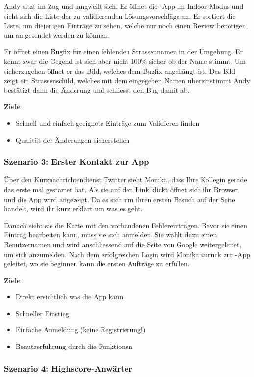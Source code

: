 Andy sitzt im Zug und langweilt sich.
Er öffnet die \kort{}-App im Indoor-Modus und sieht sich die Liste der zu validierenden Lösungsvorschläge an. 
Er sortiert die Liste, um diejenigen Einträge zu sehen, welche nur noch einen Review benötigen, um an  gesendet werden zu können.

Er öffnet einen Bugfix für einen fehlenden Strassennamen in der Umgebung.
Er kennt zwar die Gegend ist sich aber nicht 100\% sicher ob der Name stimmt.
Um sicherzugehen öffnet er das Bild, welches dem Bugfix angehängt ist.
Das Bild zeigt ein Strassenschild, welches mit dem eingegeben Namen übereinstimmt
Andy bestätigt dann die Änderung und schliesst den Bug damit ab.

\textbf{Ziele}
\begin{itemize}
\item Schnell und einfach geeignete Einträge zum Validieren finden
\item Qualität der Änderungen sicherstellen
\end{itemize}

\subsubsection{Szenario 3: Erster Kontakt zur App}

Über den Kurznachrichtendienst Twitter sieht Monika, dass Ihre Kollegin gerade das erste mal \kort{} gestartet hat.
Als sie auf den Link klickt öffnet sich ihr Browser und die App wird angezeigt.
Da es sich um ihren ersten Besuch auf der Seite handelt, wird ihr kurz erklärt um was es geht.

Danach sieht sie die Karte mit den vorhandenen Fehlereinträgen.
Bevor sie einen Eintrag bearbeiten kann, muss sie sich anmelden.
Sie wählt dazu einen Benutzernamen und wird anschliessend auf die Seite von Google weitergeleitet, um sich anzumelden.
Nach dem erfolgreichen Login wird Monika zurück zur \kort{}-App geleitet, wo sie beginnen kann die ersten Aufträge zu erfüllen.

\textbf{Ziele}
\begin{itemize}
\item Direkt ersichtlich was die App kann
\item Schneller Einstieg
\item Einfache Anmeldung (keine Registrierung!)
\item Benutzerführung durch die Funktionen
\end{itemize}

\subsubsection{Szenario 4: Highscore-Anwärter}

